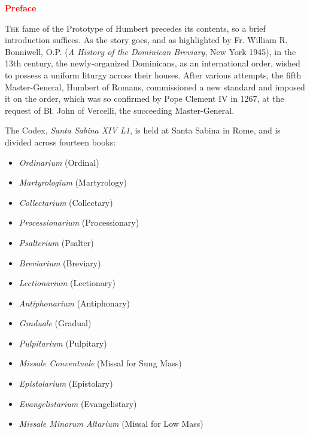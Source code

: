 \vspace{+1em}

\begin{center}
\large\textcolor{Red}{\textbf{Preface}}
\end{center}




\lettrine[lines=2]{\zallmancaps \color{Blue} T}{he} fame of the Prototype of Humbert precedes its contents, so a brief introduction suffices. As the story goes, and as highlighted by Fr. William R. Bonniwell, O.P. (\emph{A History of the Dominican Breviary}, New York 1945), in the 13th century, the newly-organized Dominicans, as an international order, wished to possess a uniform liturgy across their houses. After various attempts, the fifth Master-General, Humbert of Romans, commissioned a new standard and imposed it on the order, which was so confirmed by Pope Clement IV in 1267, at the request of Bl. John of Vercelli, the succeeding Master-General.

The Codex, \emph{Santa Sabina XIV L1}, is held at Santa Sabina in Rome, and is divided across fourteen books:
\begin{itemize}[nosep]
	\item \emph{Ordinarium} (Ordinal)
	\item \emph{Martyrologium} (Martyrology)
	\item \emph{Collectarium} (Collectary)
	\item \emph{Processionarium} (Processionary)
	\item \emph{Psalterium} (Psalter)
	\item \emph{Breviarium} (Breviary)
	\item \emph{Lectionarium} (Lectionary)
	\item \emph{Antiphonarium} (Antiphonary)
	\item \emph{Graduale} (Gradual)
	\item \emph{Pulpitarium} (Pulpitary)
	\item \emph{Missale Conventuale} (Missal for Sung Mass)
	\item \emph{Epistolarium} (Epistolary)
	\item \emph{Evangelistarium} (Evangelistary)
	\item \emph{Missale Minorum Altarium} (Missal for Low Mass)
\end{itemize}

